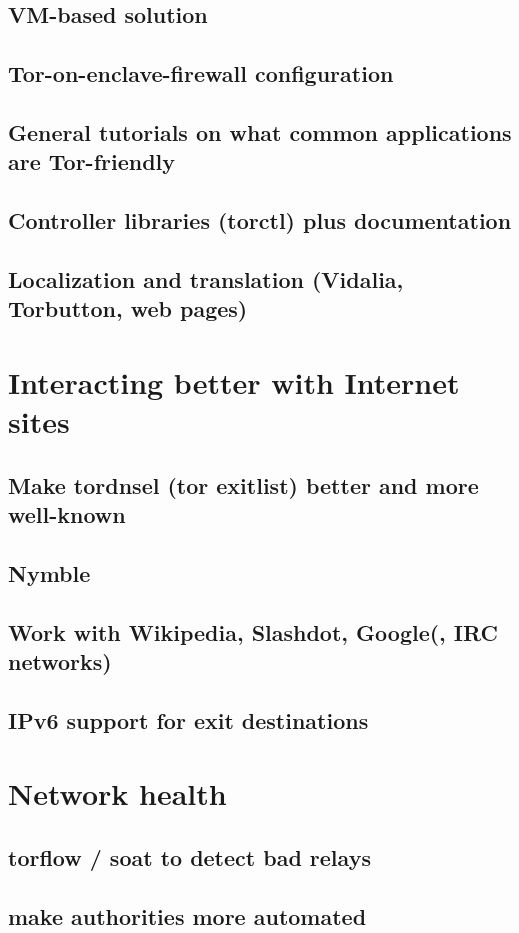 \documentclass{article}
\begin{document}
\subsection{VM-based solution}
\subsection{Tor-on-enclave-firewall configuration}
\subsection{General tutorials on what common applications are Tor-friendly}
\subsection{Controller libraries (torctl) plus documentation}
\subsection{Localization and translation (Vidalia, Torbutton, web pages)}
\section{Interacting better with Internet sites}
\subsection{Make tordnsel (tor exitlist) better and more well-known}
\subsection{Nymble}
\subsection{Work with Wikipedia, Slashdot, Google(, IRC networks)}
\subsection{IPv6 support for exit destinations}
\section{Network health}
\subsection{torflow / soat to detect bad relays}
\subsection{make authorities more automated}
\end{document}
